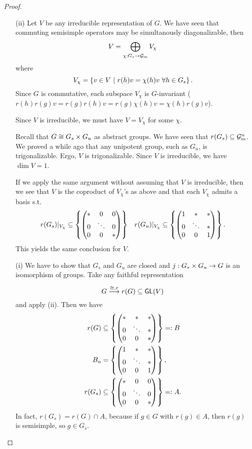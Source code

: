 \begin{proof}
\begin{enumerate}
	\item[(ii)] Let $V$ be any irreducible representation of $G$. We have seen that commuting semisimple operators may be simultanously diagonalizable, then
	\[ V = \bigoplus_{\chi : G_s \overset{}{\rightarrow} \mathcal{G}_m} V_\chi \]
	where
	\[ V_\chi = \left\lbrace v \in V ~ | ~ r(h)v = \chi(h)v ~\forall h \in G_s\right\rbrace. \]
	Since $G$ is commutative, each subspace $V_\chi$ is $G$-invariant ($r(h)r(g)v = r(g)r(h)v= r(g)\chi(h)v = \chi(h) r(g)v$).
	
	Since $V$ is irreducible, we must have $V = V_\chi$ for some $\chi$.
	
	Recall that $G \overset{}{\cong} G_s \times G_u$ as abstract groups. We have seen that $r(G_s) \subseteq \mathcal{G}_m^n$. We proved a while ago that any unipotent group, such as $G_u$, is trigonalizable. Ergo, $V$ is trigonalizable. Since $V$ is irreducible, we have $\dim V = 1$.
	
	If we apply the same argument without assuming that $V$ is irreducible, then we see that $V$ is the coproduct of $V_\chi$'s as above and that each $V_\chi$ admits a basis s.t.
	\begin{align*}
r(G_s)|_{V_\chi} \subseteq \left\lbrace\left(\begin{matrix} * & 0& 0\\
		0 & \ddots & 0\\
		0 & 0 & * \end{matrix}\right)\right\rbrace && 
r(G_u)|_{V_\chi} \subseteq \left\lbrace\left(\begin{matrix} 1 & * & *\\
		0 & \ddots & *\\
		0 & 0 & 1 \end{matrix}\right)\right\rbrace.
\end{align*}
This yields the same conclusion for $V$.
\item[(i)] We have to show that $G_s$ and $G_u$ are closed and $j : G_s \times G_u \overset{}{\rightarrow} G$ is an isomorphism of groups. Take any faithful representation
\[ G \overset{\overset{}{\cong}, r}{\longrightarrow} r(G) \subseteq \textsf{GL}(V) \]
and apply (ii). Then we have
	\begin{align*}
r(G) &\subseteq \left\lbrace\left(\begin{matrix} * & *& *\\
		0 & \ddots & *\\
		0 & 0 & * \end{matrix}\right)\right\rbrace =: B \\
B_u &= \left\lbrace\left(\begin{matrix} 1 & * & *\\
		0 & \ddots & *\\
		0 & 0 & 1 \end{matrix}\right)\right\rbrace,\\
	r(G_s) &\subseteq \left\lbrace\left(\begin{matrix} * & 0& 0\\
			0 & \ddots & 0\\
			0 & 0 & * \end{matrix}\right)\right\rbrace =: A. \\
\end{align*}
In fact, $r(G_s) = r(G) \cap A$, because if $g \in G$ with $r(g) \in A$, then $r(g)$ is semisimple, so $g \in G_s$.


\end{enumerate}
\end{proof}
